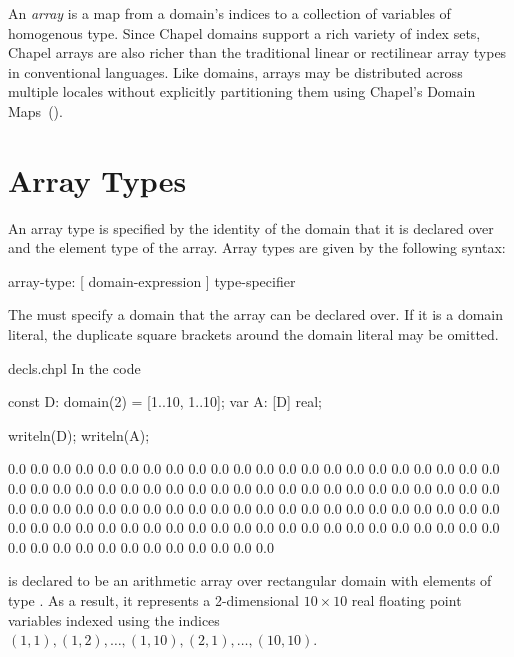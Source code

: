 \label{Arrays}

An \emph{array} is a map from a domain's indices to a collection of
variables of homogenous type.  Since Chapel domains support a rich
variety of index sets, Chapel arrays are also richer than the
traditional linear or rectilinear array types in conventional
languages.  Like domains, arrays may be distributed across multiple
locales without explicitly partitioning them using Chapel's Domain
Maps~().


\section{Array Types}
\label{Array_Types}

An array type is specified by the identity of the domain that it is
declared over and the element type of the array.  Array types are
given by the following syntax:

\begin{syntax}
array-type:
  [ domain-expression ] type-specifier
\end{syntax}
The  must specify a domain that the array can
be declared over.  If it is a domain
literal, the duplicate square brackets around the domain literal may
be omitted.

\begin{chapelexample}{decls.chpl}
In the code
\begin{chapel}
const D: domain(2) = [1..10, 1..10];
var A: [D] real;
\end{chapel}
\begin{chapelpost}
writeln(D);
writeln(A);
\end{chapelpost}
\begin{chapeloutput}
[1..10, 1..10]
0.0 0.0 0.0 0.0 0.0 0.0 0.0 0.0 0.0 0.0
0.0 0.0 0.0 0.0 0.0 0.0 0.0 0.0 0.0 0.0
0.0 0.0 0.0 0.0 0.0 0.0 0.0 0.0 0.0 0.0
0.0 0.0 0.0 0.0 0.0 0.0 0.0 0.0 0.0 0.0
0.0 0.0 0.0 0.0 0.0 0.0 0.0 0.0 0.0 0.0
0.0 0.0 0.0 0.0 0.0 0.0 0.0 0.0 0.0 0.0
0.0 0.0 0.0 0.0 0.0 0.0 0.0 0.0 0.0 0.0
0.0 0.0 0.0 0.0 0.0 0.0 0.0 0.0 0.0 0.0
0.0 0.0 0.0 0.0 0.0 0.0 0.0 0.0 0.0 0.0
0.0 0.0 0.0 0.0 0.0 0.0 0.0 0.0 0.0 0.0
\end{chapeloutput}
 is declared to be an arithmetic array over rectangular
domain  with elements of type .  As a result, it
represents a 2-dimensional $10 \times 10$ real floating point
variables indexed using the indices $(1, 1), (1, 2), \ldots, (1, 10),
(2, 1), \ldots, (10, 10)$.
\end{chapelexample}

